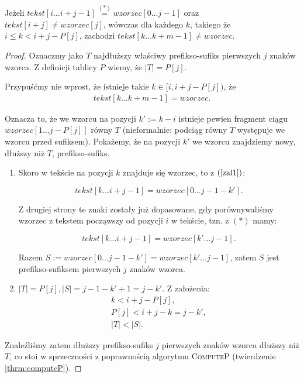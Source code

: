 \begin{lemma}
	\label{lemmakmp}
	Jeżeli $tekst[i\dots i+j-1] \mathrel{\overset{(\ast)}{=}} wzorzec[0 \dots j-1]$ oraz $tekst[i + j] \neq wzorzec[j]$, wówczas dla każdego $k$, takiego że $i \leq k < i + j - P[j]$, zachodzi $tekst[k \dots k + m - 1] \neq wzorzec$.
	\begin{proof}
		Oznaczmy jako $T$ najdłuższy właściwy prefikso-sufiks pierwszych $j$ znaków wzorca. Z definicji tablicy $P$ wiemy, że $|T|=P[j]$.
		
		Przypuśćmy nie wprost, że istnieje takie $k \in [i, i + j - P[j])$, że 
		\begin{gather}
			\label{zal1}
			tekst[k\dots k+m-1] = wzorzec.				
		\end{gather}

		Oznacza to, że we wzorcu na pozycji $k' := k - i$ istnieje pewien fragment ciągu \linebreak
		$wzorzec[{1 \dots j - P[j]}]$ równy $T$ (nieformalnie: podciąg równy $T$ występuje we wzorcu przed sufiksem).
		Pokażemy, że na pozycji $k'$ we wzorcu znajdziemy nowy, dłuższy niż $T$, prefikso-sufiks. 
		
		\begin{enumerate}
			\item Skoro w tekście na pozycji $k$ znajduje się wzorzec, to z $(\ref{zal1})$:
			 
			 $$tekst[k\dots i+j-1]=wzorzec[0\dots j-1-k'].$$ 
			 
			 Z drugiej strony te znaki zostały już dopasowane, gdy porównywaliśmy wzorzec z tekstem począwszy od pozycji $i$ w tekście, tzn. z $(\ast)$ mamy:
			 
			 $$tekst[k\dots i+j-1] = wzorzec[k' \dots j-1].$$
			 
			 Razem $S:=wzorzec[0\dots j-1-k']=wzorzec[k' \dots j-1]$, zatem $S$ jest prefikso-sufiksem pierwszych $j$ znaków wzorca.
			\item $|T|=P[j], |S| = j-1-k'+1=j-k'$. Z założenia: 
			\begin{gather*}
				k < i + j - P[j], \\
				P[j] < i + j - k = j - k', \\
				|T|<|S|.
			\end{gather*}
		\end{enumerate}
	
		Znaleźliśmy zatem dłuższy prefikso-sufiks $j$ pierwszych znaków wzorca dłuższy niż $T$, co stoi w sprzeczności z poprawnością algorytmu \textsc{ComputeP} (twierdzenie \ref{thrm:computeP}). 
	\end{proof}
\end{lemma}

